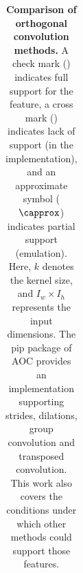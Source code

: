 \begin{table}[ht]
\begin{tabular}{llcp{16mm}cccccc}
    \end{tabular}
    \caption{\textbf{Comparison of orthogonal convolution methods.} A check mark (\cmark) indicates full support for the feature, a cross mark (\xmark) indicates lack of support (in the implementation), and an approximate symbol ($\capprox$) indicates partial support (emulation). Here, $k$ denotes the kernel size, and $I_w \times I_h$ represents the input dimensions. The pip package of AOC provides an implementation supporting strides, dilations, group convolution and transposed convolution. This work also covers the conditions under which other methods could support those features.  %
\vspace{-4mm}}
    \label{tab:big_picture}
\end{table}



